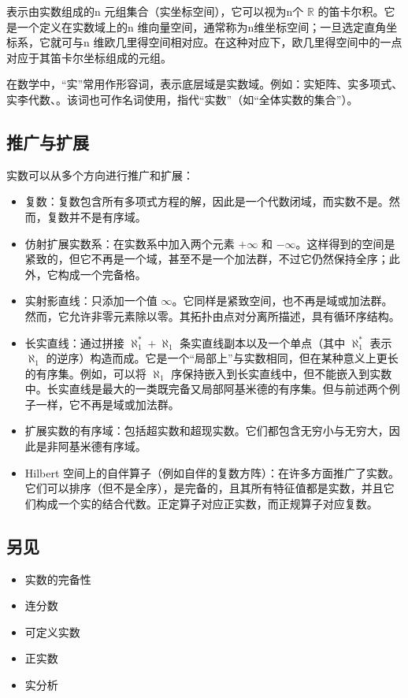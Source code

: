 表示由实数组成的n 元组集合（实坐标空间），它可以视为n个 $\mathbb{R}$ 的笛卡尔积。它是一个定义在实数域上的n 维向量空间，通常称为n维坐标空间；一旦选定直角坐标系，它就可与n 维欧几里得空间相对应。在这种对应下，欧几里得空间中的一点对应于其笛卡尔坐标组成的元组。

在数学中，“实”常用作形容词，表示底层域是实数域。例如：实矩阵、实多项式、实李代数、。该词也可作名词使用，指代“实数”（如“全体实数的集合”）。
\subsection{推广与扩展}
实数可以从多个方向进行推广和扩展：
\begin{itemize}
\item 复数：复数包含所有多项式方程的解，因此是一个代数闭域，而实数不是。然而，复数并不是有序域。
\item 仿射扩展实数系：在实数系中加入两个元素 $+\infty$ 和 $-\infty$。这样得到的空间是紧致的，但它不再是一个域，甚至不是一个加法群，不过它仍然保持全序；此外，它构成一个完备格。
\item 实射影直线：只添加一个值 $\infty$。它同样是紧致空间，也不再是域或加法群。然而，它允许非零元素除以零。其拓扑由点对分离所描述，具有循环序结构。
\item 长实直线：通过拼接 $\aleph_{1}^{*} + \aleph_{1}$ 条实直线副本以及一个单点（其中 $\aleph_{1}^{*}$ 表示 $\aleph_{1}$ 的逆序）构造而成。它是一个“局部上”与实数相同，但在某种意义上更长的有序集。例如，可以将 $\aleph_{1}$ 序保持嵌入到长实直线中，但不能嵌入到实数中。长实直线是最大的一类既完备又局部阿基米德的有序集。但与前述两个例子一样，它不再是域或加法群。
\item 扩展实数的有序域：包括超实数和超现实数。它们都包含无穷小与无穷大，因此是非阿基米德有序域。
\item Hilbert 空间上的自伴算子（例如自伴的复数方阵）：在许多方面推广了实数。它们可以排序（但不是全序），是完备的，且其所有特征值都是实数，并且它们构成一个实的结合代数。正定算子对应正实数，而正规算子对应复数。
\end{itemize}
\subsection{另见}
\begin{itemize}
\item 实数的完备性
\item 连分数
\item 可定义实数
\item 正实数
\item 实分析
\end{itemize}
